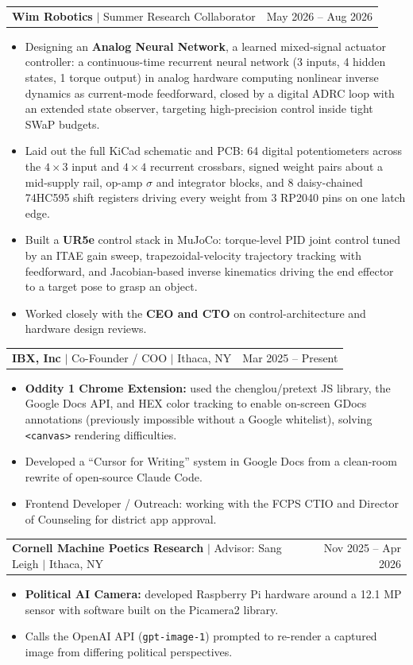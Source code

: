 \documentclass[letterpaper,10pt]{article}
\makeatletter
\newcommand{\entry}[3]{%
  \begin{tabularx}{\textwidth}{@{}X r@{}}
    \textbf{#1}#2 & #3
  \end{tabularx}\par
}
\newenvironment{bullets}
  {\begin{itemize}[leftmargin=11pt,labelsep=4pt,topsep=2pt,partopsep=0pt,
                   parsep=0pt,itemsep=1pt,label=\textbullet,
                   after=\vspace{4pt}]}
  {\end{itemize}}
\makeatother
\begin{document}
\entry{Wim Robotics}{ $|$ Summer Research Collaborator}{May 2026 -- Aug 2026}
\begin{bullets}
  \item Designing an \textbf{Analog Neural Network}, a learned mixed-signal actuator controller: a
        continuous-time recurrent neural network (3 inputs, 4 hidden states, 1 torque output) in analog
        hardware computing nonlinear inverse dynamics as current-mode feedforward, closed by a digital ADRC
        loop with an extended state observer, targeting high-precision control inside tight SWaP budgets.
  \item Laid out the full KiCad schematic and PCB: 64 digital potentiometers across the $4\times3$ input and
        $4\times4$ recurrent crossbars, signed weight pairs about a mid-supply rail, op-amp $\sigma$ and
        integrator blocks, and 8 daisy-chained 74HC595 shift registers driving every weight from 3 RP2040
        pins on one latch edge.
  \item Built a \textbf{UR5e} control stack in MuJoCo: torque-level PID joint control tuned by an ITAE gain
        sweep, trapezoidal-velocity trajectory tracking with feedforward, and Jacobian-based inverse
        kinematics driving the end effector to a target pose to grasp an object.
  \item Worked closely with the \textbf{CEO and CTO} on control-architecture and hardware design reviews.
\end{bullets}

\entry{IBX, Inc}{ $|$ Co-Founder / COO $|$ Ithaca, NY}{Mar 2025 -- Present}
\begin{bullets}
  \item \textbf{Oddity 1 Chrome Extension:} used the chenglou/pretext JS library, the Google Docs API, and HEX
        color tracking to enable on-screen GDocs annotations (previously impossible without a Google whitelist),
        solving \texttt{<canvas>} rendering difficulties.
  \item Developed a ``Cursor for Writing'' system in Google Docs from a clean-room rewrite of open-source
        Claude Code.
  \item Frontend Developer / Outreach: working with the FCPS CTIO and Director of Counseling for district
        app approval.
\end{bullets}

\entry{Cornell Machine Poetics Research}{ $|$ Advisor: Sang Leigh $|$ Ithaca, NY}{Nov 2025 -- Apr 2026}
\begin{bullets}
  \item \textbf{Political AI Camera:} developed Raspberry Pi hardware around a 12.1 MP sensor with software
        built on the Picamera2 library.
  \item Calls the OpenAI API (\texttt{gpt-image-1}) prompted to re-render a captured image from differing
        political perspectives.
\end{bullets}
\end{document}
